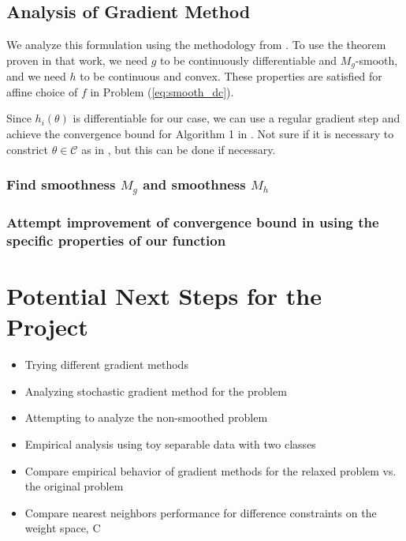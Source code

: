 \documentclass[11pt]{article}
\begin{document}
\subsection{Analysis of Gradient Method}

We analyze this formulation using the methodology from \cite{khamaru_convergence_nodate}. To use the theorem proven in that work, we need $g$ to be continuously differentiable and $M_g$-smooth, and we need $h$ to be continuous and convex. These properties are satisfied for affine choice of $f$ in Problem (\ref{eq:smooth_dc}).

Since $h_i(\theta)$ is differentiable for our case, we can use a regular gradient step and achieve the convergence bound for Algorithm 1 in \cite{khamaru_convergence_nodate}. Not sure if it is necessary to constrict $\theta \in \mathcal{C}$ as in \cite{khamaru_convergence_nodate}, but this can be done if necessary.

\subsubsection{Find smoothness $M_g$ and smoothness $M_h$}

\subsubsection{Attempt improvement of convergence bound in \cite{khamaru_convergence_nodate} using the specific properties of our function}

\section{Potential Next Steps for the Project}

\begin{itemize}
  \item Trying different gradient methods
  \item Analyzing stochastic gradient method for the problem
  \item Attempting to analyze the non-smoothed problem
  \item Empirical analysis using toy separable data with two classes
  \item Compare empirical behavior of gradient methods for the relaxed problem vs. the original problem
  \item Compare nearest neighbors performance for difference constraints on the weight space, C
\end{itemize}

\printbibliography
\end{document}
